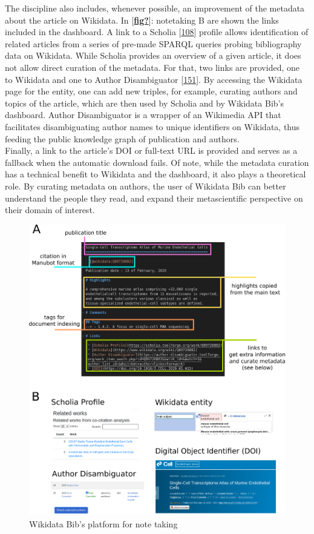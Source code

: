 The discipline also includes, whenever possible, an improvement of the metadata about the article on Wikidata.
In {[}\protect\hyperlink{ref-fig}{\textbf{fig?}}{]}: notetaking B are shown the links included in the dashboard.
A link to a Scholia {[}\protect\hyperlink{ref-hxzL9pmm}{108}{]} profile allows identification of related articles from a series of pre-made SPARQL queries probing bibliography data on Wikidata.
While Scholia provides an overview of a given article, it does not allow direct curation of the metadata.
For that, two links are provided, one to Wikidata and one to Author Disambiguator {[}\protect\hyperlink{ref-1A9RvszKC}{151}{]}.
By accessing the Wikidata page for the entity, one can add new triples, for example, curating authors and topics of the article, which are then used by Scholia and by Wikidata Bib's dashboard.
Author Disambiguator is a wrapper of an Wikimedia API that facilitates disambiguating author names to unique identifiers on Wikidata, thus feeding the public knowledge graph of publication and authors.\\
Finally, a link to the article's DOI or full-text URL is provided and serves as a fallback when the automatic download fails.
Of note, while the metadata curation has a technical benefit to Wikidata and the dashboard, it also plays a theoretical role.
By curating metadata on authors, the user of Wikidata Bib can better understand the people they read, and expand their metascientific perspective on their domain of interest.

\begin{figure}
\hypertarget{fig:notetaking}{%
\centering
\includegraphics[width=0.85\columnwidth]{images/note_taking_station_annotated_with_links.png}
\caption{Wikidata Bib's platform for note taking}\label{fig:notetaking}
}
\end{figure}

